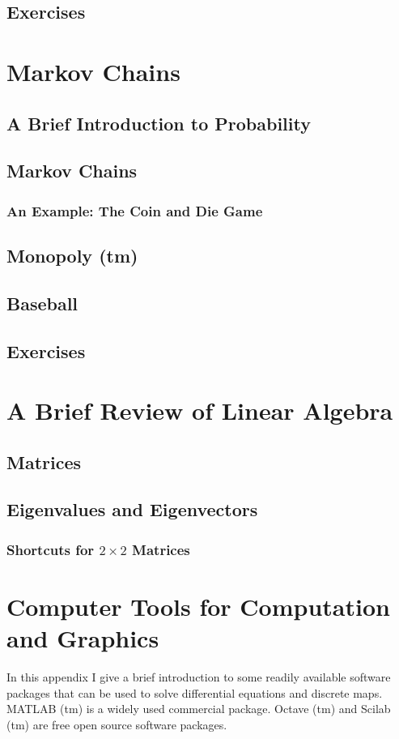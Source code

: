 \documentclass{book}
\begin{document}
\section{Exercises}
%
\chapter{Markov Chains}
\section{A Brief Introduction to Probability}
\section{Markov Chains}
\subsection{An Example: The Coin and Die Game}
\section{Monopoly (tm)}
\section{Baseball}
\section{Exercises}
\appendix
\chapter{A Brief Review of Linear Algebra}
\section{Matrices}
\section{Eigenvalues and Eigenvectors}
\subsection{Shortcuts for $2\times 2$ Matrices}
\chapter[Computer Tools]{Computer Tools for Computation and Graphics}
%
%
In this appendix I give a brief introduction to some
readily available software packages that can be used to solve
differential equations and discrete maps.  MATLAB (tm)
is a widely used commercial package.  Octave (tm) and
Scilab (tm) are free open source software packages. 
\end{document}
